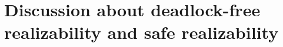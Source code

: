

%


%

%

\section{Discussion about deadlock-free realizability and safe realizability}
\label{app:discussion-deadlock-free-realizability-and-safe-realizability}
